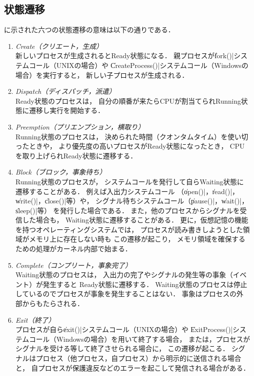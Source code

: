 \subsection{状態遷移}
に示された六つの状態遷移の意味は以下の通りである．

\begin{enumerate}
\item \emph{Create（クリエート，生成）} \\
  新しいプロセスが生成されるとReady状態になる．
  親プロセスが\|fork()|システムコール（UNIXの場合）や
  \|CreateProcess()|システムコール（Windowsの場合）を実行すると，
  新しい子プロセスが生成される．
\item \emph{Dispatch（ディスパッチ，派遣）} \\
  Ready状態のプロセスは，
  自分の順番が来たらCPUが割当てられRunning状態に遷移し実行を開始する．
\item \emph{Preemption（プリエンプション，横取り）} \\
  Running状態のプロセスは，
  決められた時間（クオンタムタイム）を使い切ったときや，
  より優先度の高いプロセスがReady状態になったとき，
  CPUを取り上げられReady状態に遷移する．
\item \emph{Block（ブロック，事象待ち）} \\
  Running状態のプロセスが，
  システムコールを発行して自らWaiting状態に遷移することがある．
  例えば入出力システムコール
  （\|open()|，\|read()|，\|write()|，\|close()|等）や，
  シグナル待ちシステムコール（\|pause()|，\|wait()|，\|sleep()|等）
  を発行した場合である．
  また，他のプロセスからシグナルを受信した場合も，
  Waiting状態に遷移することがある．
  更に，仮想記憶の機能を持つオペレーティングシステムでは，
  プロセスが読み書きしようとした領域がメモリ上に存在しない時も
  この遷移が起こり，
  メモリ領域を確保するための処理がカーネル内部で始まる．
\item \emph{Complete（コンプリート，事象完了）} \\
  Waiting状態のプロセスは，
  入出力の完了やシグナルの発生等の事象（イベント）が発生すると
  Ready状態に遷移する．
  Waiting状態のプロセスは停止しているのでプロセスが事象を発生することはない．
  事象はプロセスの外部からもたらされる．
\item \emph{Exit（終了）} \\
  プロセスが自ら\|exit()|システムコール（UNIXの場合）や
  \|ExitProcess()|システムコール（Windowsの場合）を用いて終了する場合，
  または，プロセスがシグナルを受ける等して終了させられる場合に，
  この遷移が起こる．
  シグナルはプロセス（他プロセス，自プロセス）から明示的に送信される場合と，
  自プロセスが保護違反などのエラーを起こして発信される場合がある．
\end{enumerate}

